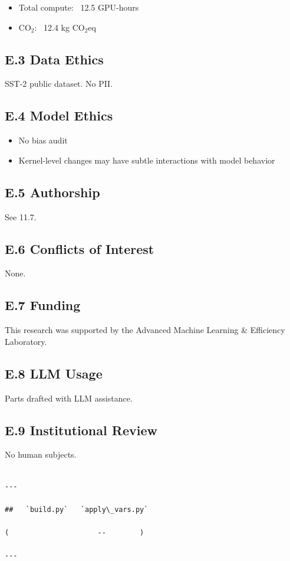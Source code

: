 \begin{itemize}
\item Total compute: ~12.5 GPU-hours
\item CO$_2$: ~12.4 kg CO$_2$eq

\end{itemize}
\subsection{E.3 Data Ethics}

SST-2 public dataset. No PII.

\subsection{E.4 Model Ethics}

\begin{itemize}
\item No bias audit
\item Kernel-level changes may have subtle interactions with model behavior

\end{itemize}
\subsection{E.5 Authorship}

See  11.7.

\subsection{E.6 Conflicts of Interest}

None.

\subsection{E.7 Funding}

This research was supported by the Advanced Machine Learning \& Efficiency Laboratory.

\subsection{E.8 LLM Usage}

Parts drafted with LLM assistance.

\subsection{E.9 Institutional Review}

No human subjects.
\begin{lstlisting}

---

##   `build.py`   `apply\_vars.py`

(                     --        )

---
\end{lstlisting}


